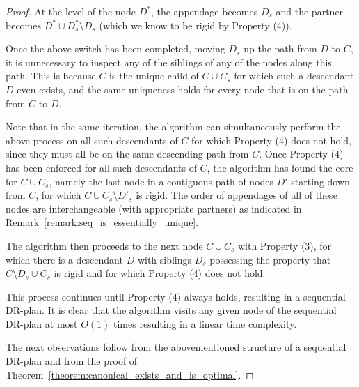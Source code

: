 \begin{proof}
    At the level of the node $D^*$, the appendage becomes $D_s$ and the partner becomes $D^*\cup D^*_s\setminus D_s$ (which we know to be rigid by Property (4)).

    Once the above switch has been completed, moving $D_s$ up the path from $D$ to $C$,
    it is unnecessary to inspect any of the siblings of any of the nodes along this path. This is because $C$ is the unique child of $C\cup C_s$ for which such a descendant $D$ even exists, and the same uniqueness holds for every node that is on the path from $C$ to $D$.

    Note that in the same iteration, the algorithm can simultaneously perform the above process on all such descendants of $C$ for which Property (4) does not hold, since they must all be on the same descending path from $C$. Once Property (4) has been enforced for all such descendants of $C$, the algorithm has found the core for $C\cup C_s$, namely the last node in a contiguous path of nodes $D'$ starting down from $C$, for which $C\cup C_s\setminus D'_s$ is rigid. The order of appendages of all of these nodes are interchangeable (with appropriate partners) as indicated in Remark~\ref{remark:seq_is_essentially_unique}.

    The algorithm then proceeds to the next node $C\cup C_s$ with Property (3), for which there is a descendant $D$ with siblings $D_s$ possessing the property that $C\setminus D_s \cup C_s$ is rigid and for which Property (4) does not hold.

    This process continues until Property (4) always holds, resulting in a sequential DR-plan. It is clear that the algorithm visits any given node of the sequential DR-plan at most $O(1)$ times resulting in a linear time complexity.

    The next observations follow from the abovementioned structure of a sequential DR-plan and from the proof of Theorem~\ref{theorem:canonical_exists_and_is_optimal}.
\end{proof}


